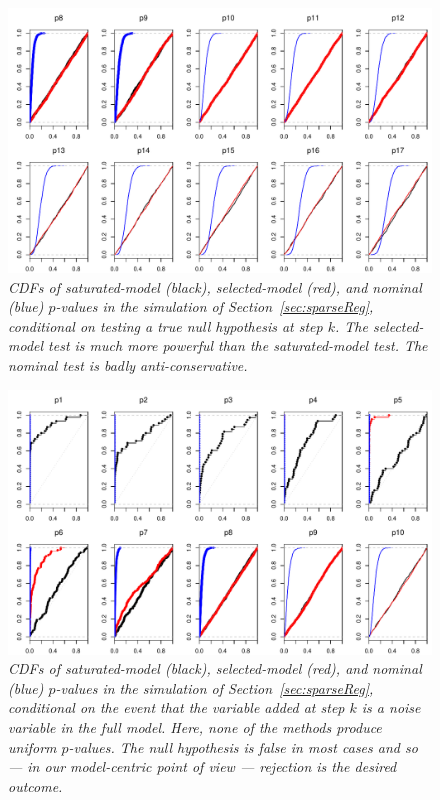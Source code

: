 \documentclass{article}
\begin{document}
\begin{figure}
  \centering
  \includegraphics[width=.8\textwidth]{figs/simulation_snr_5_alpha_05_null_true.pdf}
  \caption{\em CDFs of saturated-model (black), selected-model (red), and nominal (blue) $p$-values in the simulation of Section~\ref{sec:sparseReg}, conditional on testing a true null hypothesis at step $k$. The selected-model test is much more powerful than the saturated-model test. The nominal test is badly anti-conservative.}
  \label{fig:simulation_null_true}
\end{figure}

\begin{figure}
  \centering
  \includegraphics[width=.8\textwidth]{figs/simulation_snr_5_alpha_05_noise_var.pdf}
  \caption{\em CDFs of saturated-model (black), selected-model (red), and nominal (blue) $p$-values in the simulation of Section~\ref{sec:sparseReg}, conditional on the event that the variable added at step $k$ is a noise variable in the full model. Here, none of the methods produce uniform $p$-values. The null hypothesis is false in most cases and so --- in our model-centric point of view --- rejection is the desired outcome.}
  \label{fig:simulation_noise_var}
\end{figure}
\end{document}

